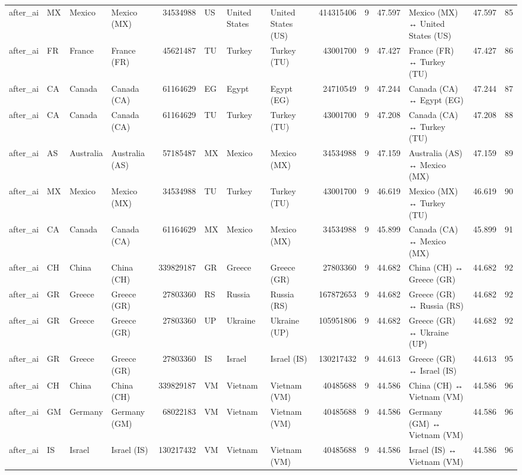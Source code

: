 \begin{tabular}{llllrlllrrrlrr}
after\_ai & MX & Mexico & Mexico (MX) & 34534988 & US & United States & United States (US) & 414315406 & 9 & 47.597 & Mexico (MX) ↔ United States (US) & 47.597 & 85 \\
after\_ai & FR & France & France (FR) & 45621487 & TU & Turkey & Turkey (TU) & 43001700 & 9 & 47.427 & France (FR) ↔ Turkey (TU) & 47.427 & 86 \\
after\_ai & CA & Canada & Canada (CA) & 61164629 & EG & Egypt & Egypt (EG) & 24710549 & 9 & 47.244 & Canada (CA) ↔ Egypt (EG) & 47.244 & 87 \\
after\_ai & CA & Canada & Canada (CA) & 61164629 & TU & Turkey & Turkey (TU) & 43001700 & 9 & 47.208 & Canada (CA) ↔ Turkey (TU) & 47.208 & 88 \\
after\_ai & AS & Australia & Australia (AS) & 57185487 & MX & Mexico & Mexico (MX) & 34534988 & 9 & 47.159 & Australia (AS) ↔ Mexico (MX) & 47.159 & 89 \\
after\_ai & MX & Mexico & Mexico (MX) & 34534988 & TU & Turkey & Turkey (TU) & 43001700 & 9 & 46.619 & Mexico (MX) ↔ Turkey (TU) & 46.619 & 90 \\
after\_ai & CA & Canada & Canada (CA) & 61164629 & MX & Mexico & Mexico (MX) & 34534988 & 9 & 45.899 & Canada (CA) ↔ Mexico (MX) & 45.899 & 91 \\
after\_ai & CH & China & China (CH) & 339829187 & GR & Greece & Greece (GR) & 27803360 & 9 & 44.682 & China (CH) ↔ Greece (GR) & 44.682 & 92 \\
after\_ai & GR & Greece & Greece (GR) & 27803360 & RS & Russia & Russia (RS) & 167872653 & 9 & 44.682 & Greece (GR) ↔ Russia (RS) & 44.682 & 92 \\
after\_ai & GR & Greece & Greece (GR) & 27803360 & UP & Ukraine & Ukraine (UP) & 105951806 & 9 & 44.682 & Greece (GR) ↔ Ukraine (UP) & 44.682 & 92 \\
after\_ai & GR & Greece & Greece (GR) & 27803360 & IS & Israel & Israel (IS) & 130217432 & 9 & 44.613 & Greece (GR) ↔ Israel (IS) & 44.613 & 95 \\
after\_ai & CH & China & China (CH) & 339829187 & VM & Vietnam & Vietnam (VM) & 40485688 & 9 & 44.586 & China (CH) ↔ Vietnam (VM) & 44.586 & 96 \\
after\_ai & GM & Germany & Germany (GM) & 68022183 & VM & Vietnam & Vietnam (VM) & 40485688 & 9 & 44.586 & Germany (GM) ↔ Vietnam (VM) & 44.586 & 96 \\
after\_ai & IS & Israel & Israel (IS) & 130217432 & VM & Vietnam & Vietnam (VM) & 40485688 & 9 & 44.586 & Israel (IS) ↔ Vietnam (VM) & 44.586 & 96 \\

\end{tabular}
